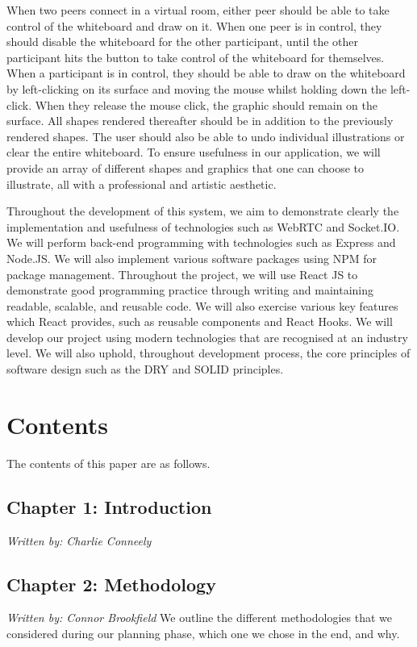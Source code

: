 When two peers connect in a virtual room, either peer should be able to take control of the whiteboard and draw on it. When one peer is in control, they should disable the whiteboard for the other participant, until the other participant hits the button to take control of the whiteboard for themselves. When a participant is in control, they should be able to draw on the whiteboard by left-clicking on its surface and moving the mouse whilst holding down the left-click. When they release the mouse click, the graphic should remain on the surface. All shapes rendered thereafter should be in addition to the previously rendered shapes. The user should also be able to undo individual illustrations or clear the entire whiteboard. To ensure usefulness in our application, we will provide an array of different shapes and graphics that one can choose to illustrate, all with a professional and artistic aesthetic.  

Throughout the development of this system, we aim to demonstrate clearly the implementation and usefulness of technologies such as WebRTC and Socket.IO. We will perform back-end programming with technologies such as Express and Node.JS. We will also implement various software packages using NPM for package management. Throughout the project, we will use React JS to demonstrate good programming practice through writing and maintaining readable, scalable, and reusable code. We will also exercise various key features which React provides, such as reusable components and React Hooks. We will develop our project using modern technologies that are recognised at an industry level. We will also uphold, throughout development process, the core principles of software design such as the DRY and SOLID principles. 

\section{Contents}
The contents of this paper are as follows.

\subsection{Chapter 1: Introduction}
\textit{Written by: Charlie Conneely} 
\subsection{Chapter 2: Methodology}
\textit{Written by: Connor Brookfield} \newline
We outline the different methodologies that we considered during our planning phase, which one we chose in the end, and why. 
